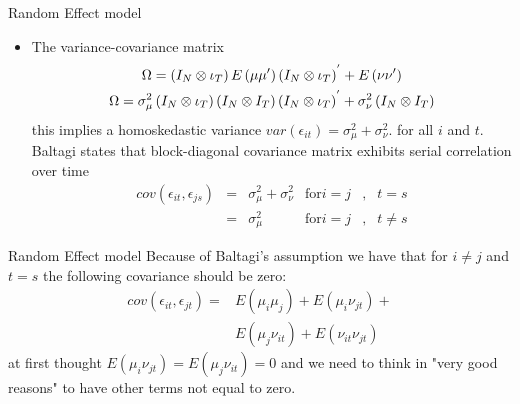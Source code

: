 \begin{frame}{Random Effect model}
	\begin{itemize}
		\item The variance-covariance matrix%
				\begin{gather}
					\Omega =\left( I_{N}\otimes \iota _{T}\right) E\left( \mathbf{\mu \mu }%
					^{\prime }\right) \left( I_{N}\otimes \iota _{T}\right) ^{^{\prime
					}}+E\left( \mathbf{\nu \nu }^{\prime }\right) \notag\\
					\Omega =\sigma _{\mu }^{2}\left( I_{N}\otimes \iota _{T}\right) \left(
					I_{N}\otimes I_{T}\right) \left( I_{N}\otimes \iota _{T}\right) ^{^{\prime
					}}+\sigma _{\nu }^{2}\left( I_{N}\otimes I_{T}\right)
				\end{gather}
		this implies a homoskedastic variance $var\left( \epsilon _{it}\right)=\sigma _{\mu }^{2}+\sigma _{\nu }^{2}.$ for all $i$ and $t$. Baltagi states that block-diagonal covariance matrix exhibits serial correlation over time
			$$	\begin{array}{cclccc}
					cov\left( \epsilon _{it},\epsilon _{js}\right) & = & \sigma _{\mu }^{2}+\sigma_{\nu }^{2} & \text{for} i = j & , & t = s\\
																{} & = & \sigma _{\mu }^{2} & \text{for} i = j & , & t \neq s
				\end{array}$$
	\end{itemize}
\end{frame}
\begin{frame}{Random Effect model}
	Because of Baltagi's assumption we have that for $i\not=j$ and $t=s$ the following covariance should be zero:%
		\begin{align*}
			cov\left( \epsilon _{it},\epsilon _{jt}\right) = & E\left( \mu _{i}\mu_{j}\right) +E\left( \mu _{i}\nu _{jt}\right) + \\
														     & E\left( \mu _{j}\nu _{it}\right) +E\left( \nu _{it}\nu _{jt}\right)
		\end{align*}
	at first thought $E\left( \mu _{i}\nu _{jt}\right) =E\left( \mu _{j}\nu_{it}\right) =0$ and we need to think in "very good reasons" to have other terms not equal to zero.
\end{frame}
